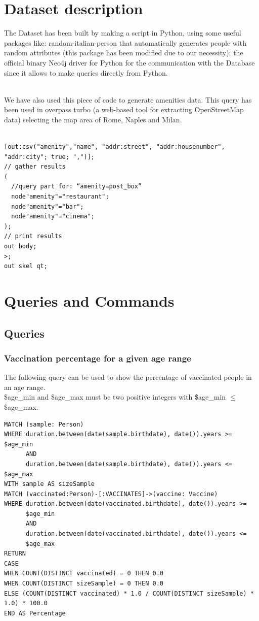 \documentclass{article}
\begin{document}
\newpage

\section{Dataset description}
The Dataset has been built by making a script in Python, using some useful packages like: random-italian-person that automatically generates people with random attributes (this package has been modified due to our necessity); the official binary Neo4j driver for Python for the communication with the Database since it allows to make queries directly from Python.

\\
\hfill\break
We have also used this piece of code to generate amenities data. This query has been used in overpass turbo (a web-based tool for extracting OpenStreetMap data) selecting the map area of Rome, Naples and Milan.

\begin{lstlisting}[language=cypher, label=lst:cypher-example]

[out:csv("amenity","name", "addr:street", "addr:housenumber", "addr:city"; true; ",")];
// gather results
(
  //query part for: “amenity=post_box”
  node"amenity"="restaurant";
  node"amenity"="bar";
  node"amenity"="cinema";
);
// print results
out body;
>;
out skel qt;
\end{lstlisting}
\newpage
\section{Queries and Commands}
\subsection{Queries}
\subsubsection{Vaccination percentage for a given age range}
The following query can be used to show the percentage of vaccinated people in an age range.\\
\$age\_min and \$age\_max must be two positive integers with \$age\_min $\le$ \$age\_max.\\

\begin{lstlisting}[language=cypher, label=lst:cypher-example]
MATCH (sample: Person)
WHERE duration.between(date(sample.birthdate), date()).years >= $age_min
      AND
      duration.between(date(sample.birthdate), date()).years <= $age_max
WITH sample AS sizeSample
MATCH (vaccinated:Person)-[:VACCINATES]->(vaccine: Vaccine)
WHERE duration.between(date(vaccinated.birthdate), date()).years >=
      $age_min
      AND
      duration.between(date(vaccinated.birthdate), date()).years <=
      $age_max
RETURN
CASE
WHEN COUNT(DISTINCT vaccinated) = 0 THEN 0.0
WHEN COUNT(DISTINCT sizeSample) = 0 THEN 0.0
ELSE (COUNT(DISTINCT vaccinated) * 1.0 / COUNT(DISTINCT sizeSample) * 1.0) * 100.0
END AS Percentage

\end{lstlisting}
\end{document}

